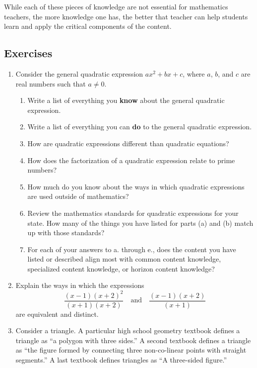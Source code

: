 \documentclass[
]{book}
\theoremstyle{definition}
\theoremstyle{definition}
\theoremstyle{definition}
\theoremstyle{definition}
\theoremstyle{remark}
\begin{document}
While each of these pieces of knowledge are not essential for mathematics teachers, the more knowledge one has, the better that teacher can help students learn and apply the critical components of the content.

\hypertarget{exercises}{%
\subsection{Exercises}\label{exercises}}

\begin{enumerate}
\def\labelenumi{\arabic{enumi}.}
\item
  Consider the general quadratic expression \(ax^2 + bx+c\), where \(a\), \(b\), and \(c\) are real numbers such that \(a\neq0\).

  \begin{enumerate}
  \def\labelenumii{\alph{enumii}.}
  \item
    Write a list of everything you \textbf{know} about the general quadratic expression.
  \item
    Write a list of everything you can \textbf{do} to the general quadratic expression.
  \item
    How are quadratic expressions different than quadratic equations?
  \item
    How does the factorization of a quadratic expression relate to prime numbers?
  \item
    How much do you know about the ways in which quadratic expressions are used outside of mathematics?
  \item
    Review the mathematics standards for quadratic expressions for your state. How many of the things you have listed for parts (a) and (b) match up with those standards?
  \item
    For each of your answers to a. through e., does the content you have listed or described align most with common content knowledge, specialized content knowledge, or horizon content knowledge?
  \end{enumerate}
\item
  Explain the ways in which the expressions
  \[\frac{(x-1)(x+2)^2}{(x+1)(x+2)} \quad \mbox{and} \quad \frac{(x-1)(x+2)}{(x+1)}\] are equivalent and distinct.
\item
  Consider a triangle. A particular high school geometry textbook defines a triangle as ``a polygon with three sides.'' A second textbook defines a triangle as ``the figure formed by connecting three non-co-linear points with straight segments.'' A last textbook defines triangles as ``A three-sided figure.''


\end{enumerate}
\end{document}

